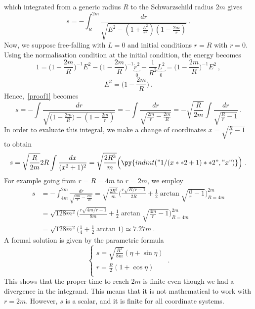     which integrated from a generic radius $R$ to the Schwarzschild radius $2m$ gives
    \begin{equation}\label{proof1}
        s = - \int_R^{2m} \frac{dr}{\sqrt{E^2 - (1 + \frac{L^2}{r^2}) (1 - \frac{2m}{r}  )}} ~.
    \end{equation}
    Now, we suppose free-falling with $L = 0$ and initial conditions $r=R$ with $\dot r = 0$. Using the normalisation condition at the initial condition, the energy becomes 
    \begin{equation*}
        1 = \Big(1 - \frac{2m}{R} \Big )^{-1} E^2 - \Big(1 - \frac{2m}{R} \Big )^{-1} \underbrace{\dot r^2}_0 - \frac{1}{R^2} \underbrace{L^2}_0 = \Big(1 - \frac{2m}{R} \Big )^{-1} E^2 ~,
    \end{equation*}
    \begin{equation*}
        E^2 = \Big(1 - \frac{2m}{R} \Big ) ~.
    \end{equation*}
    Hence,~\eqref{proof1} becomes 
    \begin{equation*}
        s = - \int \frac{dr}{\sqrt{(1 - \frac{2m}{R} \Big )- (1 - \frac{2m}{r} )}} = - \int \frac{dr}{\sqrt{ \frac{2m}{r} - \frac{2m}{R}}} = - \sqrt{\frac{R}{2m}} \int \frac{dr}{\sqrt{ \frac{R}{r} - 1}} ~.
    \end{equation*}
    In order to evaluate this integral, we make a change of coordinates $x = \sqrt{\frac{R}{r} - 1}$ to obtain 
    \begin{equation*}
        s = \sqrt{\frac{R}{2m}} 2 R \int \frac{dx}{(x^2 + 1)^2} = \sqrt{\frac{2R^3}{m}} \Big ( \py{indint("1 / (x**2 + 1)**2", "x")} \Big) ~.
    \end{equation*}
    For example going from $r = R = 4m$ to $r = 2m$, we employ
    \begin{equation*}
    \begin{aligned}
        s & = - \int_{4m}^{2m} \frac{dr}{\sqrt{ \frac{2m}{r} - \frac{2m}{R}}} = \sqrt{\frac{2R^3}{m}} \Big ( \frac{r \sqrt{R / r - 1}}{2 R} + \frac{1}{2} \arctan \sqrt{\frac{R}{r} - 1} \Big)_{R = 4m}^{2m} \\ & = \sqrt{128 m^2} \Big ( \frac{r \sqrt{4m / r - 1}}{8 m} + \frac{1}{2} \arctan \sqrt{\frac{4m}{r} - 1} \Big)_{R = 4m}^{2m}  \\ & = \sqrt{128 m^2} \Big ( \frac{1}{4} + \frac{1}{2} \arctan 1 \Big) \simeq 7.27 m ~.
    \end{aligned}
    \end{equation*}    
    A formal solution is given by the parametric formula
    \begin{equation*}
        \begin{cases}
            s = \sqrt{\frac{R^3}{8m}} (\eta + \sin \eta) \\
            r = \frac{R}{2} (1 + \cos \eta) \\
        \end{cases} ~.
    \end{equation*}
    This shows that the proper time to reach $2m$ is finite even though we had a divergence in the integrand. This means that it is not mathematical to work with $r = 2m$. However, $s$ is a scalar, and it is finite for all coordinate systems. 

